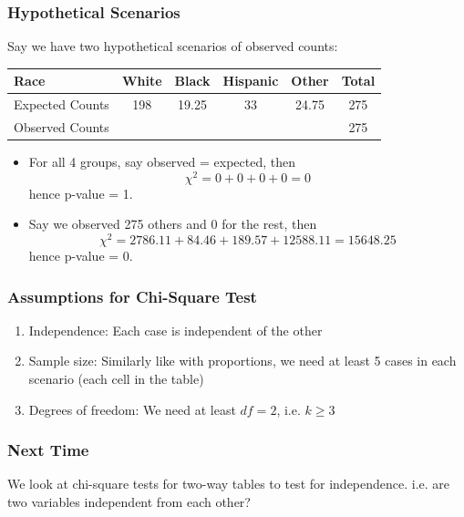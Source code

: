 \documentclass[slides]{beamer}
\newcommand{\blue}[1]{\textcolor{blue2}{#1}}
\begin{document}
\begin{frame}[fragile]
\frametitle{Hypothetical Scenarios}
Say we have two hypothetical scenarios of observed counts:
\begin{center}
\begin{tabular}{l||cccc|c}
Race & White & Black & Hispanic & Other & Total \\ 
\hline
Expected Counts & 198 & 19.25 & 33 & 24.75 & 275\\ 
Observed Counts &  &  &  &  & 275 \\ 
\end{tabular}
\end{center}

%
%
\begin{itemize}
\item For all 4 groups, say observed = expected, then
\[
\chi^2 = 0 + 0 + 0 + 0 = 0
\]
hence p-value = 1.
\pause\item Say we observed 275 others and 0 for the rest, then 
\[
\chi^2 = 2786.11 + 84.46 + 189.57 + 12588.11 = 15648.25
\]
hence p-value = 0.
\end{itemize}

\end{frame}


\begin{frame}[fragile]
\frametitle{Assumptions for Chi-Square Test}
%
%
\begin{enumerate}
\item \blue{Independence}:  Each case is independent of the other
\pause\item \blue{Sample size}:  Similarly like with proportions, we need at least 5 cases in each scenario (each cell in the table)
\pause\item \blue{Degrees of freedom}:  We need at least $df=2$, i.e. $k\geq 3$
\end{enumerate}
\end{frame}


\begin{frame}[fragile]
\frametitle{Next Time}
We look at \blue{chi-square tests for two-way tables} to test for \blue{independence}.  i.e. are two variables independent from each other?

\end{frame}
\end{document}
